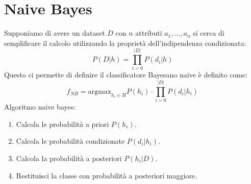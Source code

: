 \section{Naive Bayes}
Supponiamo di avere un dataset $D$ con $n$ attributi $a_1, \dots, a_n$ si cerca di semplificare il calcolo utilizzando la proprietà dell'indipendenza condizionata:
\begin{equation}
    P(D|h) = \prod_{i = 0}^{|D|} P(d_i|h)
\end{equation}
Questo ci permette di definire il classificatore Bayesano naive è definito come:
\begin{equation}
    f_{NB} = \text{argmax}_{h_i \in H} P(h_i) \cdot \prod_{i = 0}^{|D|} P(d_i|h_i)    
\end{equation}
Algoritmo naive bayes:
\begin{enumerate}
    \item Calcola le probabilità a priori $P(h_i)$.
    \item Calcola le probabilità condizionate $P(d_i|h_i)$.
    \item Calcola la probabilità a posteriori $P(h_i|D)$.
    \item Restituisci la classe con probabilità a posteriori maggiore.
\end{enumerate}
